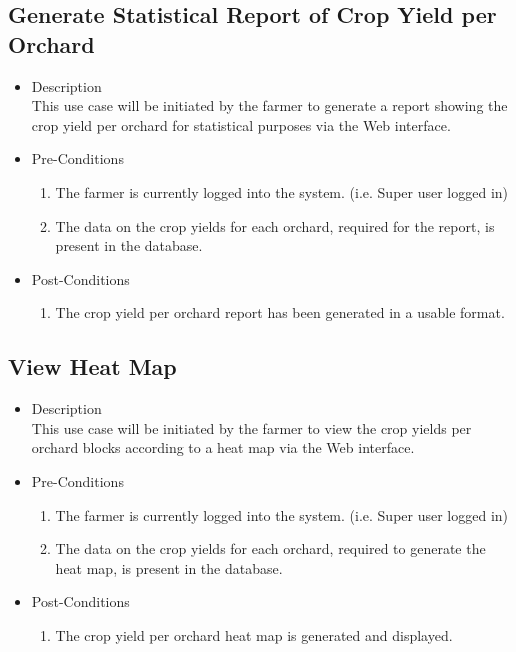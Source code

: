 \documentclass[11pt,fleqn]{book} %
\begin{document}
	\subsection{Generate Statistical Report of Crop Yield per Orchard}
	\begin{itemize}
		\item Description\\
		This use case will be initiated by the farmer to generate a report showing the crop yield per orchard for statistical purposes via the Web interface.
		\item Pre-Conditions
		\begin{enumerate}
			\item The farmer is currently logged into the system. (i.e. Super user logged in)
			\item The data on the crop yields for each orchard, required for the report, is present in the database.									
		\end{enumerate}
		\item Post-Conditions
		\begin{enumerate}
			\item The crop yield per orchard report has been generated in a usable format.
		\end{enumerate}
	\end{itemize}
	
	\subsection{View Heat Map}
	\begin{itemize}
		\item Description\\
		This use case will be initiated by the farmer to view the crop yields per orchard blocks according to a heat map via the Web interface.
		\item Pre-Conditions
		\begin{enumerate}
			\item The farmer is currently logged into the system. (i.e. Super user logged in)
			\item The data on the crop yields for each orchard, required to generate the heat map, is present in the database.	
		\end{enumerate}
		\item Post-Conditions
		\begin{enumerate}
			\item The crop yield per orchard heat map is generated and displayed.
		\end{enumerate}
	\end{itemize}
	
\end{document}
